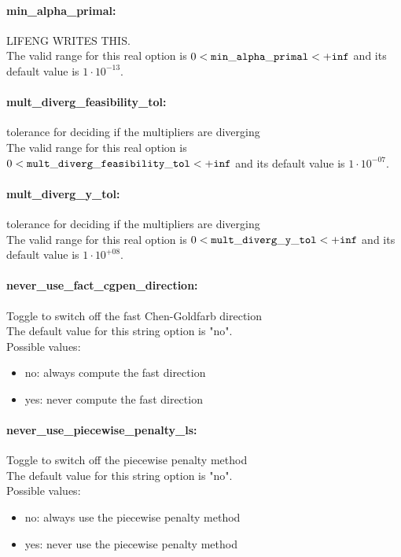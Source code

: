 \paragraph{min\_alpha\_primal:}\label{opt:min_alpha_primal} LIFENG WRITES THIS. \\
 The valid range for this real option is 
$0 <  {\tt min\_alpha\_primal } <  {\tt +inf}$
and its default value is $1 \cdot 10^{-13}$.


\paragraph{mult\_diverg\_feasibility\_tol:}\label{opt:mult_diverg_feasibility_tol} tolerance for deciding if the multipliers are diverging \\
 The valid range for this real option is 
$0 <  {\tt mult\_diverg\_feasibility\_tol } <  {\tt +inf}$
and its default value is $1 \cdot 10^{-07}$.


\paragraph{mult\_diverg\_y\_tol:}\label{opt:mult_diverg_y_tol} tolerance for deciding if the multipliers are diverging \\
 The valid range for this real option is 
$0 <  {\tt mult\_diverg\_y\_tol } <  {\tt +inf}$
and its default value is $1 \cdot 10^{+08}$.


\paragraph{never\_use\_fact\_cgpen\_direction:}\label{opt:never_use_fact_cgpen_direction} Toggle to switch off the fast Chen-Goldfarb direction \\
 The default value for this string option is "no".
\\ 
Possible values:
\begin{itemize}
   \item no: always compute the fast direction
   \item yes: never compute the fast direction
\end{itemize}

\paragraph{never\_use\_piecewise\_penalty\_ls:}\label{opt:never_use_piecewise_penalty_ls} Toggle to switch off the piecewise penalty method \\
 The default value for this string option is "no".
\\ 
Possible values:
\begin{itemize}
   \item no: always use the piecewise penalty method
   \item yes: never use the piecewise penalty method
\end{itemize}

